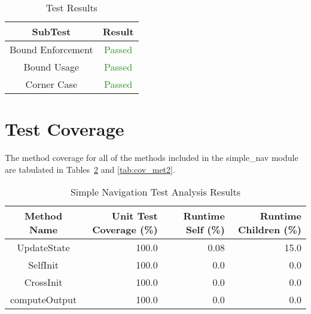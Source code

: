 \documentclass[]{BasiliskReportMemo}
\begin{document}
\begin{table}[htbp]
    \caption{Test Results}
\label{tab:results}
    \centering \fontsize{10}{10}\selectfont
\begin{tabular}{|c||c|}
\hline
SubTest & Result \\ \hline \hline
Bound Enforcement& \textcolor{ForestGreen}{Passed} \\ \hline
Bound Usage &  \textcolor{ForestGreen}{Passed}\\ \hline
Corner Case &  \textcolor{ForestGreen}{Passed}\\ \hline
\end{tabular}
\end{table}



\section{Test Coverage}
The method coverage for all of the methods included in the simple\_nav 
module are tabulated in Tables~\ref{tab:cov_met} and \ref{tab:cov_met2}.

\begin{table}[htbp]
    \caption{Simple Navigation Test Analysis Results}
   \label{tab:cov_met}
        \centering \fontsize{10}{10}\selectfont
   \begin{tabular}{c | r | r | r} %
      \hline
      Method Name    & Unit Test Coverage (\%) & Runtime Self (\%) & Runtime Children (\%) \\
      \hline
      UpdateState & 100.0 & 0.08 & 15.0 \\
      SelfInit & 100.0 & 0.0 & 0.0 \\
      CrossInit & 100.0 & 0.0 & 0.0 \\
      computeOutput & 100.0 & 0.0 & 0.0 \\
      \hline
   \end{tabular}
\end{table}
\end{document}
